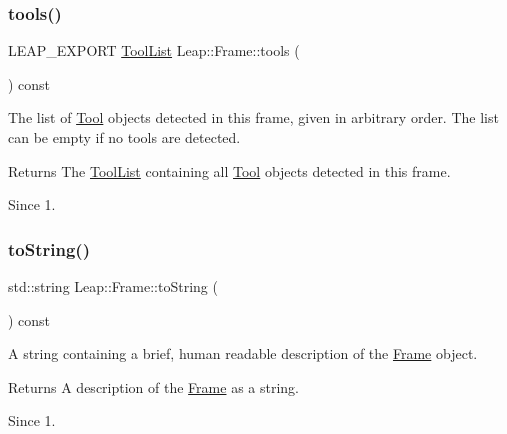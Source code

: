 \subsubsection{\texorpdfstring{tools()}{tools()}}
{\footnotesize\ttfamily L\+E\+A\+P\+\_\+\+E\+X\+P\+O\+RT \hyperlink{class_leap_1_1_tool_list}{Tool\+List} Leap\+::\+Frame\+::tools (\begin{DoxyParamCaption}{ }\end{DoxyParamCaption}) const}

The list of \hyperlink{class_leap_1_1_tool}{Tool} objects detected in this frame, given in arbitrary order. The list can be empty if no tools are detected.


\begin{DoxyCodeInclude}
\end{DoxyCodeInclude}


\begin{DoxyReturn}{Returns}
The \hyperlink{class_leap_1_1_tool_list}{Tool\+List} containing all \hyperlink{class_leap_1_1_tool}{Tool} objects detected in this frame. 
\end{DoxyReturn}
\begin{DoxySince}{Since}
1. 
\end{DoxySince}
\mbox{\label{class_leap_1_1_frame_ad18e9898875818374462f5531cfcb7a1}} 
\subsubsection{\texorpdfstring{to\+String()}{toString()}}
{\footnotesize\ttfamily std\+::string Leap\+::\+Frame\+::to\+String (\begin{DoxyParamCaption}{ }\end{DoxyParamCaption}) const\hspace{0.3cm}{\ttfamily [inline]}}

A string containing a brief, human readable description of the \hyperlink{class_leap_1_1_frame}{Frame} object.

\begin{DoxyReturn}{Returns}
A description of the \hyperlink{class_leap_1_1_frame}{Frame} as a string. 
\end{DoxyReturn}
\begin{DoxySince}{Since}
1. 
\end{DoxySince}
\mbox{\label{class_leap_1_1_frame_ae49ca7a76631ddd2af748b7e27b766c4}} 
